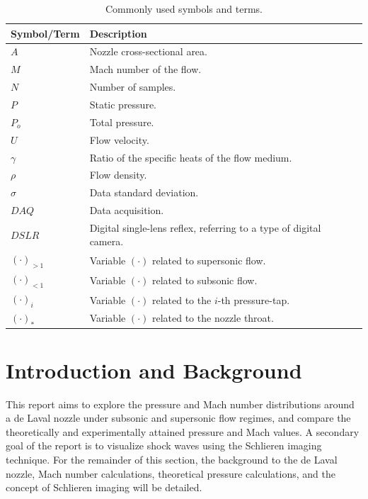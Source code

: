 \documentclass[runningheads]{llncs}
\begin{document}
\begin{table}[h]
    \centering
    \begin{tabular}{p{4.5cm}p{11cm}}
        \toprule
        Symbol/Term & Description \\
        \midrule
        $A$ & Nozzle cross-sectional area. \\
        $M$ & Mach number of the flow. \\
        $N$ & Number of samples. \\
        $P$ & Static pressure. \\
        $P_o$ & Total pressure. \\
        $U$ & Flow velocity. \\
        $\gamma$ & Ratio of the specific heats of the flow medium. \\
        $\rho$ & Flow density. \\
        $\sigma$ & Data standard deviation. \\
        $DAQ$ & Data acquisition. \\
        $DSLR$ & Digital single-lens reflex, referring to a type of digital camera.\\
        $(\cdot)_{>1}$ & Variable $(\cdot)$ related to supersonic flow. \\
        $(\cdot)_{<1}$ & Variable $(\cdot)$ related to subsonic flow. \\
        $(\cdot)_i$ & Variable $(\cdot)$ related to the $i$-th pressure-tap. \\
        $(\cdot)_*$ & Variable $(\cdot)$ related to the nozzle throat. \\
        \bottomrule
    \end{tabular}
    \caption{Commonly used symbols and terms.}
    \label{tab:nomenclature}
\end{table}




\newpage
\section{Introduction and Background}\label{sec:introduction_and_background}

This report aims to explore the pressure and Mach number distributions around a de Laval nozzle under subsonic and supersonic flow regimes, and compare the theoretically and experimentally attained pressure and Mach values. A secondary goal of the report is to visualize shock waves using the Schlieren imaging technique. For the remainder of this section, the background to the de Laval nozzle, Mach number calculations, theoretical pressure calculations, and the concept of Schlieren imaging will be detailed.
\end{document}
